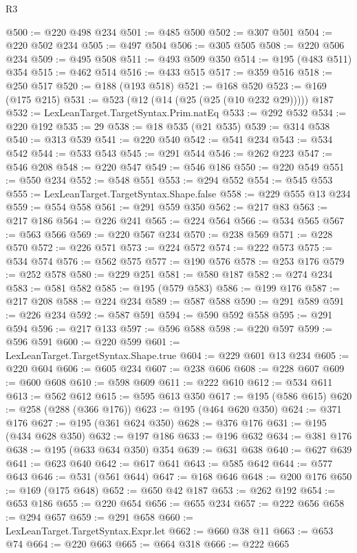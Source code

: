 \begin{lexlean}{R3}
\begin{coremodule}
@500 := @220 @498 @234
@501 := @485 @500
@502 := @307 @501
@504 := @220 @502 @234
@505 := @497 @504
@506 := @305 @505
@508 := @220 @506 @234
@509 := @495 @508
@511 := @493 @509 @350
@514 := @195 (@483 @511) @354
@515 := @462 @514
@516 := @433 @515
@517 := @359 @516
@518 := @250 @517
@520 := @188 (@193 @518)
@521 := @168 @520
@523 := @169 (@175 @215)
@531 := @523 (@12 (@14 (@25 (@25 (@10 @232 @29))))) @187
@532 := LexLeanTarget.TargetSyntax.Prim.natEq
@533 := @292 @532
@534 := @220 @192
@535 := 29
@538 := @18 @535 (@21 @535)
@539 := @314 @538
@540 := @313 @539
@541 := @220 @540
@542 := @541 @234
@543 := @534 @542
@544 := @533 @543
@545 := @291 @544
@546 := @262 @223
@547 := @546 @208
@548 := @220 @547
@549 := @546 @186
@550 := @220 @549
@551 := @550 @234
@552 := @548 @551
@553 := @294 @552
@554 := @545 @553
@555 := LexLeanTarget.TargetSyntax.Shape.false
@558 := @229 @555 @13 @234
@559 := @554 @558
@561 := @291 @559 @350
@562 := @217 @83
@563 := @217 @186
@564 := @226 @241
@565 := @224 @564
@566 := @534 @565
@567 := @563 @566
@569 := @220 @567 @234
@570 := @238 @569
@571 := @228 @570
@572 := @226 @571
@573 := @224 @572
@574 := @222 @573
@575 := @534 @574
@576 := @562 @575
@577 := @190 @576
@578 := @253 @176
@579 := @252 @578
@580 := @229 @251
@581 := @580 @187
@582 := @274 @234
@583 := @581 @582
@585 := @195 (@579 @583)
@586 := @199 @176
@587 := @217 @208
@588 := @224 @234
@589 := @587 @588
@590 := @291 @589
@591 := @226 @234
@592 := @587 @591
@594 := @590 @592 @558
@595 := @291 @594
@596 := @217 @133
@597 := @596 @588
@598 := @220 @597
@599 := @596 @591
@600 := @220 @599
@601 := LexLeanTarget.TargetSyntax.Shape.true
@604 := @229 @601 @13 @234
@605 := @220 @604
@606 := @605 @234
@607 := @238 @606
@608 := @228 @607
@609 := @600 @608
@610 := @598 @609
@611 := @222 @610
@612 := @534 @611
@613 := @562 @612
@615 := @595 @613 @350
@617 := @195 (@586 @615)
@620 := @258 (@288 (@366 @176))
@623 := @195 (@464 @620 @350)
@624 := @371 @176
@627 := @195 (@361 @624 @350)
@628 := @376 @176
@631 := @195 (@434 @628 @350)
@632 := @197 @186
@633 := @196 @632
@634 := @381 @176
@638 := @195 (@633 @634 @350) @354
@639 := @631 @638
@640 := @627 @639
@641 := @623 @640
@642 := @617 @641
@643 := @585 @642
@644 := @577 @643
@646 := @531 (@561 @644)
@647 := @168 @646
@648 := @200 @176
@650 := @169 (@175 @648)
@652 := @650 @42 @187
@653 := @262 @192
@654 := @653 @186
@655 := @220 @654
@656 := @655 @234
@657 := @222 @656
@658 := @294 @657
@659 := @291 @658
@660 := LexLeanTarget.TargetSyntax.Expr.let
@662 := @660 @38 @11
@663 := @653 @74
@664 := @220 @663
@665 := @664 @318
@666 := @222 @665

\end{coremodule}
\end{lexlean}
